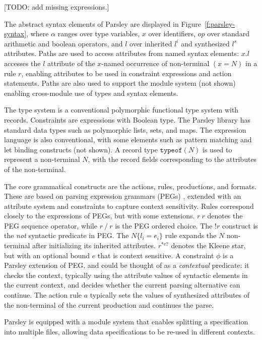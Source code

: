 \documentclass[letterpaper]{article}
\newcommand{\todo}[1]{{\color{red}[TODO: #1]}}
\begin{document}
\todo{add missing expressions.}

The abstract syntax elements of Parsley are displayed in
Figure~\ref{f:parsley-syntax}, where $\alpha$ ranges over type
variables, $x$ over identifiers, $op$ over standard arithmetic and
boolean operators, and $l$ over inherited $l^i$ and synthesized $l^s$
attributes.  Paths are used to  access attributes from named syntax
elements: $x.l$ accesses the $l$ attribute of the $x$-named occurrence
of non-terminal $(x=N)$ in a rule $r$, enabling attributes to be used
in constraint expressions and action statements.  Paths are also used
to support the module system (not shown) enabling cross-module use of
types and syntax elements.

The type system is a conventional polymorphic functional type system
with records. Constraints are expressions with Boolean type.  The
Parsley library has standard data types such as polymorphic lists,
sets, and maps.  The expression language is also conventional, with
some elements such as pattern matching and let binding constructs (not
shown).  A record type $\texttt{typeof}(N)$ is used to represent a
non-terminal $N$, with the record fields corresponding to the
attributes of the non-terminal.

The core grammatical constructs are the actions, rules, productions,
and formats.  These are based on parsing expression grammars (PEGs)
\cite{ford2004popl}, extended with an attribute system and
constraints to capture context sensitivity.  Rules correspond closely to
the expressions of PEGs, but with some extensions.  $r\ r$ denotes the
PEG sequence operator, while $r\ /\ r$ is the PEG ordered choice.  The
$!r$ construct is the \emph{not} syntactic predicate in PEG.  The
$N\{l_i=e_i\}$ rule expands the $N$ non-terminal after initializing
its inherited attributes. $r^{*e?}$ denotes the Kleene star, but with
an optional bound $e$ that is context sensitive.  A constraint $\phi$
is a Parsley extension of PEG, and could be thought of as a
\emph{contextual} predicate: it checks the context, typically using
the attribute values of syntactic elements in the current context, and
decides whether the current parsing alternative can continue.  The
action rule $a$ typically sets the values of synthesized attributes
of the non-terminal of the current production and continues the parse.

Parsley is equipped with a module system that enables splitting a
specification into multiple files, allowing data specifications to be
re-used in different contexts.
\end{document}
